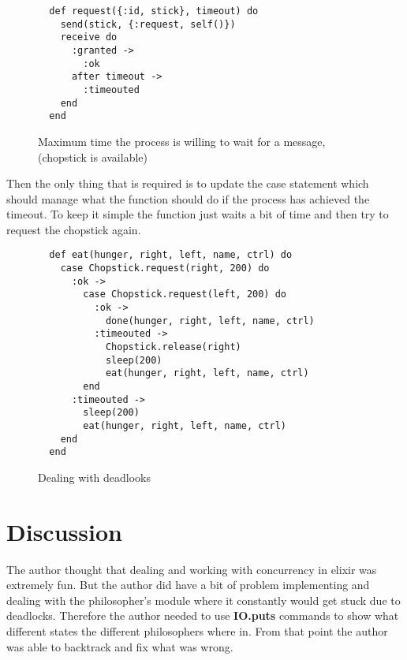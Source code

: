 \documentclass[a4paper,11pt]{article}
\begin{document}
\begin{figure}[H]
\begin{verbatim}
  def request({:id, stick}, timeout) do
    send(stick, {:request, self()})
    receive do
      :granted ->
        :ok
      after timeout ->
        :timeouted
    end
  end
\end{verbatim}
\caption{Maximum time the process is willing to wait for a message, (chopstick is available)}
\label{Figure:7}
\end{figure}

Then the only thing that is required is to update the case statement which should manage what the function should do if the process has achieved the timeout. To keep it simple the function just waits a bit of time and then try to request the chopstick again.

\begin{figure}[H]
\begin{verbatim}
  def eat(hunger, right, left, name, ctrl) do
    case Chopstick.request(right, 200) do
      :ok ->
        case Chopstick.request(left, 200) do
          :ok ->
            done(hunger, right, left, name, ctrl)
          :timeouted ->
            Chopstick.release(right)
            sleep(200)
            eat(hunger, right, left, name, ctrl)
        end
      :timeouted ->
        sleep(200)
        eat(hunger, right, left, name, ctrl)
    end
  end
\end{verbatim}
\caption{Dealing with deadlooks}
\label{Figure:8}
\end{figure}

\section*{Discussion}
The author thought that dealing and working with concurrency in elixir was extremely fun. But the author did have a bit of problem implementing and dealing with the philosopher’s module where it constantly would get stuck due to deadlocks. Therefore the author needed to use \textbf{IO.puts} commands to show what different states the different philosophers where in. From that point the author was able to backtrack and fix what was wrong.
\end{document}
